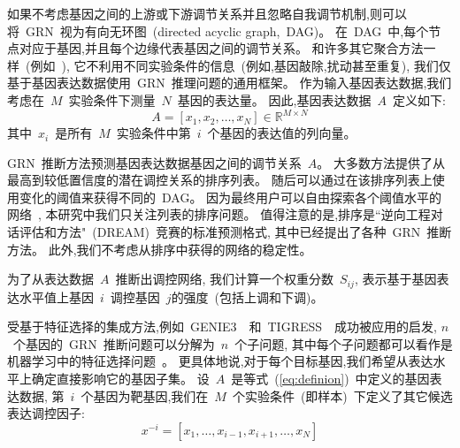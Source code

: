 如果不考虑基因之间的上游或下游调节关系并且忽略自我调节机制,则可以将~GRN~视为有向无环图~(directed acyclic graph,~DAG)。
在~DAG~中,每个节点对应于基因,并且每个边缘代表基因之间的调节关系。
和许多其它聚合方法一样~(例如~\cite{huynh2010inferring,Haury2012,slawek2013ennet,ruyssinck2014nimefi,guo2016gene,zheng2019ensemble}),
它不利用不同实验条件的信息~(例如,基因敲除,扰动甚至重复),
我们仅基于基因表达数据使用~GRN~推理问题的通用框架。
作为输入基因表达数据,我们考虑在~$M$~实验条件下测量~$N$~基因的表达量。
因此,基因表达数据~$A$~定义如下:
\begin{equation}
\label{eq:definion}
A = [x_1,x_2,\ldots,x_N] \in \mathbb{R} ^ {M \times N}
\end{equation}
其中~$x_i$~是所有~$M$~实验条件中第~$i$~个基因的表达值的列向量。

GRN~推断方法预测基因表达数据基因之间的调节关系~$A$。
大多数方法提供了从最高到较低置信度的潜在调控关系的排序列表。
随后可以通过在该排序列表上使用变化的阈值来获得不同的~DAG。
因为最终用户可以自由探索各个阈值水平的网络~\cite{slawek2013ennet},
本研究中我们只关注列表的排序问题。
值得注意的是,排序是``逆向工程对话评估和方法"~(DREAM)~\cite{stolovitzky2007dialogue}竞赛的标准预测格式,
其中已经提出了各种~GRN~推断方法。
此外,我们不考虑从排序中获得的网络的稳定性。

为了从表达数据~$A$~推断出调控网络,
我们计算一个权重分数~$S_{ij}$,
表示基于基因表达水平值上基因~$i$~调控基因~$j$的强度~(包括上调和下调)。


受基于特征选择的集成方法,例如~GENIE3~\cite{huynh2010inferring}~和~TIGRESS~\cite{Haury2012}~成功被应用的启发,
$n$~个基因的~GRN~推断问题可以分解为~$n$~个子问题,
其中每个子问题都可以看作是机器学习中的特征选择问题~\cite{nasrabadi2007pattern}。
更具体地说,对于每个目标基因,我们希望从表达水平上确定直接影响它的基因子集。
设~$A$~是等式~(\ref{eq:definion})~中定义的基因表达数据,
第~$i$~个基因为靶基因,我们在~$M$~个实验条件~(即样本)~下定义了其它候选表达调控因子:
\begin{equation}
  \label{eq:x}
  x^{-i} = [x_1,\ldots,x_{i-1},x_{i+1},\ldots,x_N]
  \end{equation}

